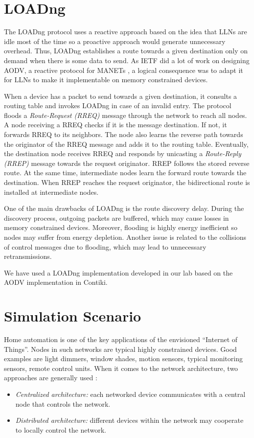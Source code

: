 \documentclass[conference,10pt,a4paper]{IEEEtran}
\begin{document}
\section{LOADng}
\label{load-overview}
The LOADng protocol \cite{loadng-draft} uses a reactive approach based on the
idea
that LLNs are idle most of the time so a proactive approach would generate
unnecessary overhead. Thus, LOADng establishes a route towards a given
destination only on demand when there is some data to send. As IETF did a lot of
work on designing AODV, a reactive protocol for MANETs \cite{aodv-rfc},
a logical consequence was to adapt it for LLNs to make it
implementable on memory constrained devices.

When a device has a packet to send towards a given destination, it consults a
routing table and invokes LOADng in case of an invalid entry. 
The protocol floods a \textit{Route-Request (RREQ)} message through
the network to reach all nodes. 
A node receiving a RREQ checks
if it is the message destination. If not, it forwards RREQ to its neighbors. The node also
learns the reverse path towards the originator of the RREQ message and adds it to
the routing table. Eventually, the destination node receives RREQ and
responds by unicasting a \textit{Route-Reply (RREP)} message towards
the request originator. RREP follows the stored reverse
route. At the same time, intermediate nodes learn the forward route towards the
destination. When RREP reaches the request originator, the
bidirectional route is installed at intermediate
nodes. 

One of the main drawbacks of LOADng is the route discovery delay. During the
discovery process, outgoing packets are buffered, which may cause losses in memory
constrained devices. 
Moreover, flooding is highly energy inefficient so nodes may suffer from energy depletion.
Another issue is related to the collisions of control messages due to flooding, which may lead to unnecessary retransmissions.

We have used a LOADng implementation developed in our lab based on the AODV implementation in Contiki.





\section{Simulation Scenario}
\label{simulation-scenario}

Home automation is one of the key applications of the envisioned ``Internet of
Things''. 
Nodes in such networks are typical highly constrained devices. Good examples are
light dimmers, window shades, motion sensors, typical monitoring sensors, remote
control units. When it comes to the network architecture, two approaches are
generally used \cite{routingreq-home}:
\begin{itemize}
\item{\textit{Centralized architecture:} each networked device communicates with
    a central node that controls the network.}
\item{\textit{Distributed architecture:} different devices within the network
    may cooperate to locally control the network.}
\end{itemize}
\end{document}
